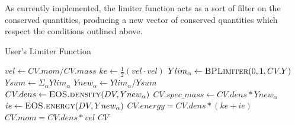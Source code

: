 \documentclass{article}
\begin{document}
As currently implemented, the limiter function acts as a sort of filter on the conserved quantities, producing a new vector of conserved quantities which respect the conditions outlined above.  
\begin{algorithm}
  \caption{User's Limiter Function}
  \begin{algorithmic}[1]
    \State $vel \gets CV.mom / CV.mass$
    \State $ke \gets \frac{1}{2}({vel}\cdot{vel})$
    \State $Ylim_\alpha \gets \Call{BPLimiter}{0, 1, CV.Y}$
    \State $Ysum \gets \Sigma_\alpha{Ylim_\alpha}$
    \State $Ynew_\alpha \gets Ylim_\alpha / Ysum$
    \State $CV.dens \gets \Call{EOS.density}{DV, Ynew_\alpha}$
    \State $CV.spec\_mass \gets CV.dens * Ynew_\alpha$
    \State $ie \gets \Call{EOS.energy}{DV, Ynew_\alpha}$
    \State $CV.energy = CV.dens * (ke + ie)$
    \State $CV.mom = CV.dens * vel$
    \State \Return $CV$
    \EndProcedure  \end{algorithmic}
\end{algorithm}
\end{document}
